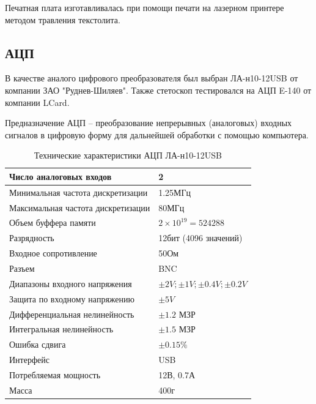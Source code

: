 Печатная плата изготавливалась при помощи печати на лазерном принтере методом травления текстолита. 
\subsection{АЦП}
В качестве аналого цифрового преобразователя был выбран ЛА-н10-12USB от компании ЗАО "Руднев-Шиляев". Также стетоскоп тестировался на АЦП E-140 от компании LCard. 

Предназначение АЦП – преобразование непрерывных (аналоговых) входных сигналов в цифровую форму для дальнейшей обработки с помощью компьютера.

\begin{table}[h]
\centering
\label{my-label}
\begin{tabular}{|l|l|}
                                                                      \hline
Число аналоговых входов            & 2                             \\ \hline
Минимальная частота дискретизации  & 1.25МГц                       \\ \hline
Максимальная частота дискретизации & 80МГц                         \\ \hline
Объем буффера памяти               & $2\times10^{19}=524288$       \\ \hline
Разрядность                        & 12бит (4096 значений)         \\ \hline
Входное сопротивление              & 50Ом                          \\ \hline
Разъем                             & BNC                           \\ \hline
Диапазоны входного напряжения      & $\pm2V;\pm1V;\pm0.4V;\pm0.2V$ \\ \hline
Защита по входному напряжению      & $\pm5V$                       \\ \hline
Дифференциальная нелинейность      & $\pm1.2$ МЗР                  \\ \hline
Интегральная нелинейность          & $\pm1.5$ МЗР                  \\ \hline
Ошибка сдвига                      & $\pm0.15\%$                   \\ \hline
Интерфейс                          & USB                           \\ \hline
Потребляемая мощность              & 12В, 0.7А                     \\ \hline
Масса                              & 400г                          \\ \hline
\end{tabular}
\caption{Технические характеристики АЦП ЛА-н10-12USB}
\end{table}

